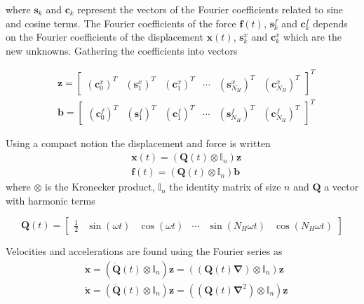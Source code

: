 where $\bm s_k$ and $\bm c_k$ represent the vectors of the Fourier coefficients
related to sine and cosine terms. The Fourier coefficients of the force $\bm f(t)$,
$\bm s^f_k$ and $\bm c^f_k$ depends on the Fourier coefficients of the
displacement $\bm x(t)$, $\bm s^x_k$ and $\bm c^x_k$ which are the new unknowns.
Gathering the coefficients into vectors

\begin{align}
  \label{eq:hb_coeffz}
  &\bm z =
    \begin{bmatrix}
      (\bm c^x_0)^T & (\bm s^x_1)^T & (\bm c^x_1)^T & \cdots &
      (\bm s^x_{N_H})^T & (\bm c^x_{N_H})^T
    \end{bmatrix}^T \\
  \label{eq:hb_coeffz}
  &\bm b =
    \begin{bmatrix}
      (\bm c^f_0)^T & (\bm s^f_1)^T & (\bm c^f_1)^T & \cdots &
      (\bm s^f_{N_H})^T & (\bm c^f_{N_H})^T
    \end{bmatrix}^T
\end{align}

Using a compact notion the displacement and force is written
\begin{align}
  \label{eq:hm_x_compact}
  &\bm x(t) = (\bm Q(t) \otimes \mathbb{I}_n) \bm z \\
  \label{eq:hb_y_compact}
  &\bm f(t) = (\bm Q(t) \otimes \mathbb{I}_n) \bm b
\end{align}
where $\otimes$ is the Kronecker product, $\mathbb{I}_n$ the identity matrix of
size $n$ and $\bm Q$ a vector with harmonic terms

\begin{equation}
  \label{eq:hb_Q}
  \bm Q(t) =
  \begin{bmatrix}
    \frac{1}{2} & \sin(\omega t) & \cos(\omega t) & \cdots & \sin(N_H \omega t) &
    \cos(N_H \omega t)
  \end{bmatrix}
\end{equation}

Velocities and accelerations are found using the Fourier series as
\begin{align}
  \label{eq:hb_vel}
  &\dot{\bm x} = \left( \dot{\bm Q}(t) \otimes \mathbb{I}_n \right) \bm z =
    \left( (\bm Q(t) \bm \nabla) \otimes \mathbb{I}_n \right) \bm z \\
  \label{eq:hb_acc}
  &\ddot{\bm x} = \left( \ddot{\bm Q}(t) \otimes \mathbb{I}_n \right) \bm z =
    \left( (\bm Q(t) \bm \nabla^2) \otimes \mathbb{I}_n \right) \bm z \\
\end{align}


